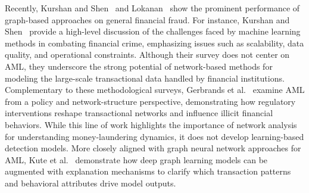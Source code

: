 Recently, Kurshan and Shen~\parencite*{kurshan2020graph} and Lokanan~\parencite*{lokanan2023financial} show the prominent performance of graph-based approaches on general financial fraud. For instance, Kurshan and Shen~\parencite*{kurshan2020graph} provide a high-level discussion of the challenges faced by machine learning methods in combating financial crime, emphasizing issues such as scalability, data quality, and operational constraints. Although their survey does not center on AML, they underscore the strong potential of network-based methods for modeling the large-scale transactional data handled by financial institutions. Complementary to these methodological surveys, Gerbrands et al.~\parencite*{gerbrands2022effect} examine AML from a policy and network-structure perspective, demonstrating how regulatory interventions reshape transactional networks and influence illicit financial behaviors. While this line of work highlights the importance of network analysis for understanding money-laundering dynamics, it does not develop learning-based detection models. More closely aligned with graph neural network approaches for AML, Kute et al.~\parencite*{kute2022explainable, kute2024explainable} demonstrate how deep graph learning models can be augmented with explanation mechanisms to clarify which transaction patterns and behavioral attributes drive model outputs. 


